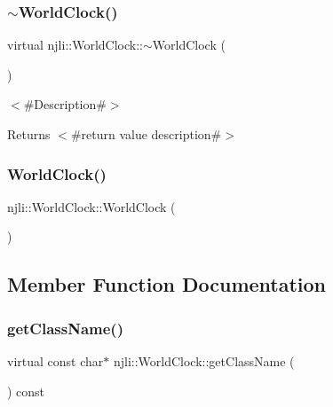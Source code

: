 \subsubsection{\texorpdfstring{$\sim$\+World\+Clock()}{~WorldClock()}}
{\footnotesize\ttfamily virtual njli\+::\+World\+Clock\+::$\sim$\+World\+Clock (\begin{DoxyParamCaption}{ }\end{DoxyParamCaption})\hspace{0.3cm}{\ttfamily [virtual]}}

$<$\#\+Description\#$>$

\begin{DoxyReturn}{Returns}
$<$\#return value description\#$>$ 
\end{DoxyReturn}
\mbox{\label{classnjli_1_1_world_clock_a7980edaac13345c4a1589542a699d53e}} 
\subsubsection{\texorpdfstring{World\+Clock()}{WorldClock()}\hspace{0.1cm}{\footnotesize\ttfamily [2/2]}}
{\footnotesize\ttfamily njli\+::\+World\+Clock\+::\+World\+Clock (\begin{DoxyParamCaption}\item[{const \mbox{\hyperlink{classnjli_1_1_world_clock}{World\+Clock}} \&}]{ }\end{DoxyParamCaption})\hspace{0.3cm}{\ttfamily [private]}}



\subsection{Member Function Documentation}
\mbox{\label{classnjli_1_1_world_clock_a3d049ae0564d07c40cc0f9a3d5ccf20e}} 
\subsubsection{\texorpdfstring{get\+Class\+Name()}{getClassName()}}
{\footnotesize\ttfamily virtual const char$\ast$ njli\+::\+World\+Clock\+::get\+Class\+Name (\begin{DoxyParamCaption}{ }\end{DoxyParamCaption}) const\hspace{0.3cm}{\ttfamily [virtual]}}

